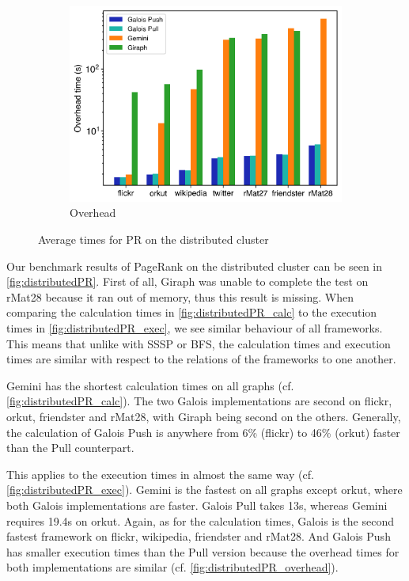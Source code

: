 \begin{figure}
\begin{subfigure}{0.32\textwidth}
		\includegraphics[width=\linewidth]{../../plots/distributedPR_overheadTime.png}
		\caption{Overhead}
		\label{fig:distributedPR_overhead}
	\end{subfigure}
	\hfil
	\caption{Average times for PR on the distributed cluster}
	\label{fig:distributedPR}
\end{figure}

Our benchmark results of PageRank on the distributed cluster can be seen in \autoref{fig:distributedPR}.
First of all, Giraph was unable to complete the test on rMat28 because it ran out of memory, thus this result is missing.
When comparing the calculation times in \autoref{fig:distributedPR_calc} to the execution times in \autoref{fig:distributedPR_exec}, we see similar behaviour of all frameworks.
This means that unlike with SSSP or BFS, the calculation times and execution times are similar with respect to the relations of the frameworks to one another.

Gemini has the shortest calculation times on all graphs (cf. \autoref{fig:distributedPR_calc}).
The two Galois implementations are second on flickr, orkut, friendster and rMat28, with Giraph being second on the others.
Generally, the calculation of Galois Push is anywhere from 6\% (flickr) to 46\% (orkut) faster than the Pull counterpart.

This applies to the execution times in almost the same way (cf. \autoref{fig:distributedPR_exec}).
Gemini is the fastest on all graphs except orkut, where both Galois implementations are faster. Galois Pull takes 13s, whereas Gemini requires 19.4s on orkut.
Again, as for the calculation times, Galois is the second fastest framework on flickr, wikipedia, friendster and rMat28.
And Galois Push has smaller execution times than the Pull version because the overhead times for both implementations are similar (cf. \autoref{fig:distributedPR_overhead}).

